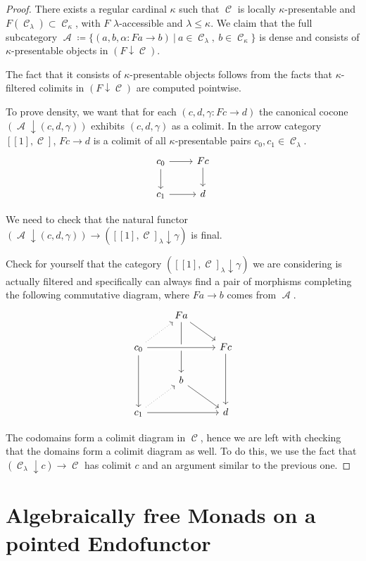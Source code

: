 \documentclass[a4paper,11pt,oneside,openany]{scrbook}
\DeclareMathOperator{\A}{\mathcal{A}}
\DeclareMathOperator{\C}{\mathcal{C}}
\theoremstyle{definition}
\theoremstyle{definition}
\begin{document}
\begin{proof}
    There exists a regular cardinal $\kappa$ such that $\C$ is locally $\kappa$-presentable and $F(\C_\lambda)\subset\C_\kappa$, with $F$ $\lambda$-accessible and $\lambda\leq\kappa$. We claim that the full subcategory $\A\coloneqq\{(a,b,\alpha\colon Fa\rightarrow b)\ |\ a\in\C_\lambda,\ b\in\C_\kappa\}$ is dense and consists of $\kappa$-presentable objects in $(F\downarrow\C)$.
    
    The fact that it consists of $\kappa$-presentable objects follows from the facts that $\kappa$-filtered colimits in $(F\downarrow\C)$ are computed pointwise.
    
    To prove density, we want that for each $(c,d,\gamma\colon Fc\rightarrow d)$ the canonical cocone $(\A\downarrow (c,d,\gamma))$ exhibits $(c,d,\gamma)$ as a colimit. In the arrow category $[[1],\C]$, $Fc\rightarrow d$ is a colimit of all $\kappa$-presentable pairs $c_0,c_1\in\C_\lambda$.
    \[
    \begin{tikzcd}
        c_0\ar[d]\ar[r]
        & Fc\ar[d] \\
        c_1\ar[r]
        & d
    \end{tikzcd}
    \]
    
    We need to check that the natural functor $(\A\downarrow (c,d,\gamma))\rightarrow ([[1],\C]_\lambda\downarrow\gamma)$ is final.
    
    Check for yourself that the category $([[1],\C]_\lambda\downarrow\gamma)$ we are considering is actually filtered and specifically can always find a pair of morphisms completing the following commutative diagram, where $Fa\rightarrow b$ comes from $\A$.
    \[
    \begin{tikzcd}
        & Fa\ar[dr]\ar[dd] \\
        c_0\ar[ur, dotted]\ar[rr, crossing over]\ar[dd]
        && Fc\ar[dd] \\
        & b\ar[dr] \\
        c_1\ar[ur, dotted]\ar[rr]
        && d
    \end{tikzcd}
    \]
    
    The codomains form a colimit diagram in $\C$, hence we are left with checking that the domains form a colimit diagram as well. To do this, we use the fact that $(\C_\lambda\downarrow c)\rightarrow\C$ has colimit $c$ and an argument similar to the previous one.
\end{proof}

\section{Algebraically free Monads on a pointed Endofunctor}
\end{document}
